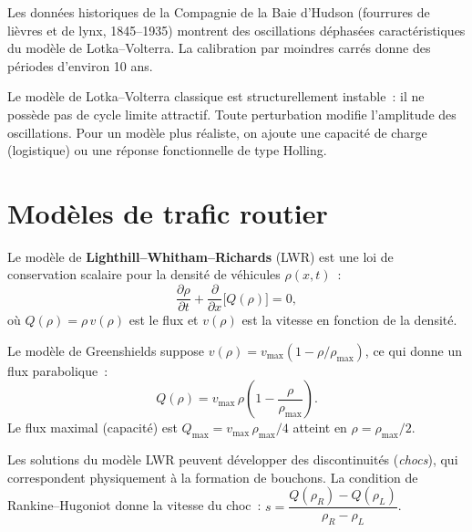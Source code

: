 \begin{exemple}
Les donn\'ees historiques de la Compagnie de la Baie d'Hudson (fourrures
de li\`evres et de lynx, 1845--1935) montrent des oscillations
d\'ephas\'ees caract\'eristiques du mod\`ele de Lotka--Volterra. La
calibration par moindres carr\'es donne des p\'eriodes d'environ 10 ans.
\end{exemple}

\begin{attention}
Le mod\`ele de Lotka--Volterra classique est structurellement instable~:
il ne poss\`ede pas de cycle limite attractif. Toute perturbation modifie
l'amplitude des oscillations. Pour un mod\`ele plus r\'ealiste, on
ajoute une capacit\'e de charge (logistique) ou une r\'eponse fonctionnelle
de type Holling.
\end{attention}

\section{Mod\`eles de trafic routier}
\label{sec:trafic}

\begin{definition}
Le mod\`ele de \textbf{Lighthill--Whitham--Richards} (LWR) est une loi de
conservation scalaire pour la densit\'e de v\'ehicules $\rho(x,t)$~:
\[
  \frac{\partial \rho}{\partial t} +
  \frac{\partial}{\partial x}\bigl[Q(\rho)\bigr] = 0,
\]
o\`u $Q(\rho) = \rho\, v(\rho)$ est le flux et $v(\rho)$ est la vitesse
en fonction de la densit\'e.
\end{definition}

\begin{proposition}
Le mod\`ele de Greenshields suppose $v(\rho) = v_{\max}(1 - \rho/\rho_{\max})$,
ce qui donne un flux parabolique~:
\[
  Q(\rho) = v_{\max}\,\rho\left(1 - \frac{\rho}{\rho_{\max}}\right).
\]
Le flux maximal (capacit\'e) est $Q_{\max} = v_{\max}\,\rho_{\max}/4$
atteint en $\rho = \rho_{\max}/2$.
\end{proposition}

\begin{remarque}
Les solutions du mod\`ele LWR peuvent d\'evelopper des discontinuit\'es
(\emph{chocs}), qui correspondent physiquement \`a la formation de
bouchons. La condition de Rankine--Hugoniot
donne la vitesse du choc~:
$s = \dfrac{Q(\rho_R) - Q(\rho_L)}{\rho_R - \rho_L}$.
\end{remarque}

